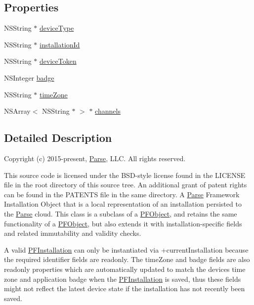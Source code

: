 \subsection*{Properties}
\begin{DoxyCompactItemize}
\item 
N\+S\+String $\ast$ \hyperlink{interface_p_f_installation_afac8d2521c0fd031e204c5642ce271a6}{device\+Type}
\begin{DoxyCompactList}\small\item\em 

 \end{DoxyCompactList}\item 
N\+S\+String $\ast$ \hyperlink{interface_p_f_installation_aba5ea4cb6705ac365a6a33fcf775deb8}{installation\+Id}
\item 
N\+S\+String $\ast$ \hyperlink{interface_p_f_installation_a5ea812bfe9db860563f3b672dc657ce7}{device\+Token}
\item 
N\+S\+Integer \hyperlink{interface_p_f_installation_add31abb42268a9d3f2e744de1316f993}{badge}
\item 
N\+S\+String $\ast$ \hyperlink{interface_p_f_installation_adb6faa1119a0a6155940bf6837037bff}{time\+Zone}
\item 
N\+S\+Array$<$ N\+S\+String $\ast$ $>$ $\ast$ \hyperlink{interface_p_f_installation_a647f10455d9fc2608317520b34de22ee}{channels}
\end{DoxyCompactItemize}


\subsection{Detailed Description}
Copyright (c) 2015-\/present, \hyperlink{interface_parse}{Parse}, L\+L\+C. All rights reserved.

This source code is licensed under the B\+S\+D-\/style license found in the L\+I\+C\+E\+N\+S\+E file in the root directory of this source tree. An additional grant of patent rights can be found in the P\+A\+T\+E\+N\+T\+S file in the same directory. A \hyperlink{interface_parse}{Parse} Framework Installation Object that is a local representation of an installation persisted to the \hyperlink{interface_parse}{Parse} cloud. This class is a subclass of a {\ttfamily \hyperlink{interface_p_f_object}{P\+F\+Object}}, and retains the same functionality of a \hyperlink{interface_p_f_object}{P\+F\+Object}, but also extends it with installation-\/specific fields and related immutability and validity checks.

A valid {\ttfamily \hyperlink{interface_p_f_installation}{P\+F\+Installation}} can only be instantiated via {\ttfamily +current\+Installation} because the required identifier fields are readonly. The {\ttfamily time\+Zone} and {\ttfamily badge} fields are also readonly properties which are automatically updated to match the device\textquotesingle{}s time zone and application badge when the {\ttfamily \hyperlink{interface_p_f_installation}{P\+F\+Installation}} is saved, thus these fields might not reflect the latest device state if the installation has not recently been saved.

